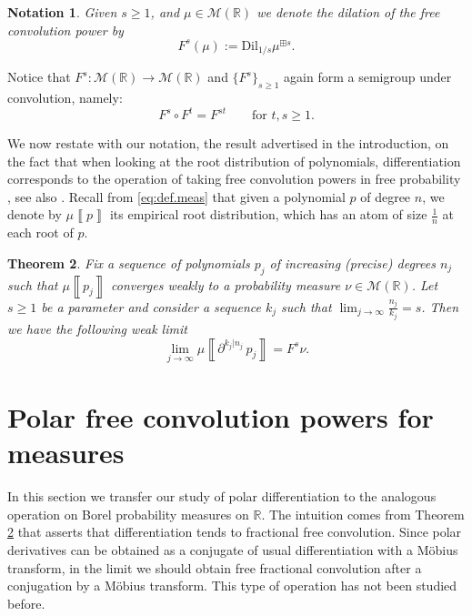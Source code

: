 \documentclass[reqno,11pt]{amsart}
\newtheorem{theorem}{Theorem}[section]
\newtheorem{notation}[theorem]{Notation}
\theoremstyle{remark}
\newcommand{\rr}{\mathbb{R}}
\newcommand{\MM}{\mathcal{M}}
\newcommand{\dil}[1]{\mbox{Dil}_{#1}}
\newcommand{\diff}[2]{\partial^{#1|#2}\, }  %
\newcommand{\freepower}[1]{F^{#1}}
\newcommand{\meas}[1]{\mu \left\llbracket #1 \right\rrbracket}
\begin{document}
\begin{notation}
Given $s\geq 1$, and $\mu\in \MM(\rr)$  we denote the dilation of the free convolution power by 
$$\freepower{s}(\mu):= \dil{1/s}\mu^{\boxplus s}.$$
\end{notation}
Notice that $\freepower{s}: \MM(\rr) \to \MM(\rr)$ and $\{\freepower{s}\}_{s\geq 1}$ again form a semigroup under convolution, namely:
$$\freepower{s} \circ \freepower{t} = \freepower{st} \qquad \text{for } t,s \geq 1.$$

We now restate with our notation, the result advertised in the introduction, on the fact that when looking at the root distribution of polynomials, differentiation corresponds to the operation of taking free convolution powers in free probability \cite{hoskins2023dynamics}, see also \cite{steinerberger2019nonlocal,steinerberger2023free,arizmendi2023finite,arizmendi2024s}. Recall from \eqref{eq:def.meas} that given a polynomial $p$ of degree $n$, we denote by $\meas{p}$ its empirical root distribution, which has an atom of size $\tfrac{1}{n}$ at each root of $p$.

\begin{theorem}\label{thm:convegence.of.iterative.derivatives}
Fix a sequence of polynomials $p_j$ of increasing (precise) degrees $n_j$ such that $\meas{p_j}$ converges weakly to a probability measure $\nu \in \MM(\rr)$. Let $s\geq 1$ be a parameter and consider a sequence $k_j$ such that $\lim_{j\to\infty}\frac{n_j}{k_j}=s$. Then we have the following weak limit
$$\lim_{j\to\infty} \meas{\diff{k_j}{n_j} p_j}=  \freepower{s} \nu.$$ 
\end{theorem}


\section{Polar free convolution powers for measures}\label{sec:polarfreeconvolution}
In this section we transfer our study of polar differentiation to the analogous operation on Borel probability measures on $\rr$. The intuition comes from Theorem \ref{thm:convegence.of.iterative.derivatives} that asserts that differentiation tends to fractional free convolution. Since polar derivatives can be obtained as a conjugate of usual differentiation with a Möbius transform, in the limit we should obtain free fractional convolution after a conjugation by a Möbius transform. This type of operation has not been studied before.
\end{document}
